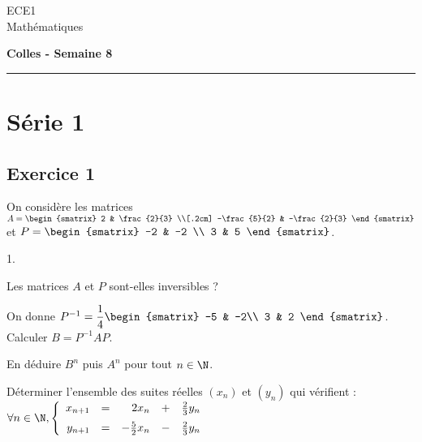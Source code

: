 \documentclass[11pt]{article}%
\begin{document}
\begin{flushleft}
ECE1 \\
Mathématiques
\end{flushleft}

\begin{center}
\textbf{\Large{Colles - Semaine 8}}
\end{center}

\hrule

\vspace*{0,2cm}



\section{Série 1}

\subsection*{Exercice 1}
\noindent
  On considère les matrices $A =
  \begin{smatrix}
    2 & \frac{2}{3} \\[.2cm]
    -\frac{5}{2} & -\frac{2}{3}
  \end{smatrix}$
  et
  $P =
  \begin{smatrix}
    -2 & -2 \\
    3 & 5
  \end{smatrix}
  $.
  \begin{noliste}{1.}
  \item Les matrices $A$ et $P$ sont-elles inversibles ?
  \item On donne $P^{-1}=\dfrac{1}{4} 
  \begin{smatrix}
    -5 & -2\\
    3 & 2
  \end{smatrix}
  $. Calculer $B = P^{-1} A P$.
  \item En déduire $B^n$ puis $A^n$ pour tout $n\in \N$.
  \item Déterminer l'ensemble des suites réelles $(x_n)$ et $(y_n)$
    qui vérifient : $\forall n \in \N, \left\{
    \begin{array}{rcrrr}
      x_{n+1} & = & 2 x_n & + & \frac{2}{3} y_n \\[.2cm]
      y_{n+1} & = & -\frac{5}{2} x_n & - & \frac{2}{3} y_n
    \end{array}
    \right.
    $
  \end{noliste}
\end{document}
